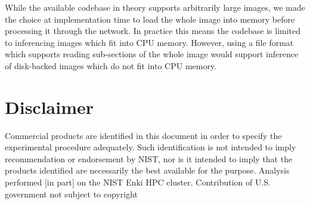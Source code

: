 \documentclass[letterpaper]{article} %
\begin{document}
While the available codebase in theory supports arbitrarily large images, we made the choice at implementation time to load the whole image into memory before processing it through the network. In practice this means the codebase is limited to inferencing images which fit into CPU memory. However, using a file format which supports reading sub-sections of the whole image would support inference of disk-backed images which do not fit into CPU memory. 



\section{Disclaimer}

Commercial products are identified in this document in order to specify the experimental procedure adequately. Such identification is not intended to imply recommendation or endorsement by NIST, nor is it intended to imply that the products identified are necessarily the best available for the purpose. Analysis performed [in part] on the NIST Enki HPC cluster. Contribution of U.S. government not subject to copyright



{\fontsize{9.0pt}{10.0pt} 
\selectfont


}
\end{document}
